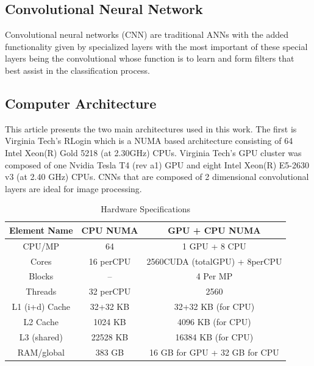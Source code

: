 \documentclass[journal]{IEEEtran}
\begin{document}
\subsection{Convolutional Neural Network}
Convolutional neural networks (CNN) are traditional ANNs with the added functionality given by specialized layers with the most important of these special layers being the convolutional whose function is to learn and form filters that best assist in the classification process.

\subsection{Computer Architecture}
This article presents the two main architectures used in this work. The first is Virginia Tech's RLogin which is a NUMA based architecture consisting of 64 Intel Xeon(R) Gold 5218 (at 2.30GHz) CPUs. Virginia Tech's GPU cluster was composed of one Nvidia Tesla T4 (rev a1) GPU and eight Intel Xeon(R) E5-2630 v3 (at 2.40 GHz) CPUs. CNNs that are composed of 2 dimensional convolutional layers are ideal for image processing.

\begin{table}[hbt!]
\caption {Hardware Specifications} \label{tab:title}
\renewcommand{\arraystretch}{1.3}
\label{Architecture_Table}
\centering
\begin{tabular}{|c||c||c|}
\hline
\textbf{Element Name} & \textbf{CPU NUMA} & \textbf{GPU + CPU NUMA} \\
\hline
CPU/MP & 64 & 1 GPU + 8 CPU\\
\hline
Cores & 16 perCPU & 2560CUDA (totalGPU) + 8perCPU \\
\hline
Blocks & -- & 4 Per MP \\
\hline
Threads & 32 perCPU & 2560 \\
\hline
L1 (i+d) Cache & 32+32 KB & 32+32 KB (for CPU) \\
\hline
L2 Cache & 1024 KB & 4096 KB (for CPU) \\
\hline
L3 (shared) & 22528 KB & 16384 KB (for CPU) \\
\hline
RAM/global & 383 GB & 16 GB for GPU + 32 GB for CPU \\
\hline
\end{tabular}
\end{table}
\end{document}
